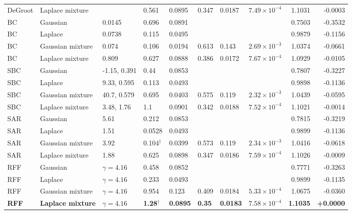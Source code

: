 \begin{longtable}{llllllllrr}
DeGroot & Laplace mixture &  & 0.561 & 0.0895 & 0.347 & 0.0187 & $7.49\times10^{-4}$ & 1.1031 & -0.0003 \\
BC & Gaussian & 0.0145 & 0.696 & 0.0891 &  &  &  & 0.7503 & -0.3532 \\
BC & Laplace & 0.0738 & 0.115 & 0.0495 &  &  &  & 0.9879 & -0.1156 \\
BC & Gaussian mixture & 0.074 & 0.106 & 0.0194 & 0.613 & 0.143 & $2.69\times10^{-3}$ & 1.0374 & -0.0661 \\
BC & Laplace mixture & 0.809 & 0.627 & 0.0888 & 0.386 & 0.0172 & $7.67\times10^{-4}$ & 1.0929 & -0.0105 \\
SBC & Gaussian & -1.15, 0.391 & 0.44 & 0.0853 &  &  &  & 0.7807 & -0.3227 \\
SBC & Laplace & 9.33, 0.595 & 0.113 & 0.0493 &  &  &  & 0.9898 & -0.1136 \\
SBC & Gaussian mixture & 40.7, 0.579 & 0.695 & 0.0403 & 0.575 & 0.119 & $2.32\times10^{-3}$ & 1.0439 & -0.0595 \\
SBC & Laplace mixture & 3.48, 1.76 & 1.1 & 0.0901 & 0.342 & 0.0188 & $7.52\times10^{-4}$ & 1.1021 & -0.0014 \\
SAR & Gaussian & 5.61 & 0.212 & 0.0853 &  &  &  & 0.7815 & -0.3219 \\
SAR & Laplace & 1.51 & 0.0528 & 0.0493 &  &  &  & 0.9899 & -0.1136 \\
SAR & Gaussian mixture & 3.92 & 0.104$^{\dagger}$ & 0.0399 & 0.573 & 0.119 & $2.34\times10^{-3}$ & 1.0416 & -0.0618 \\
SAR & Laplace mixture & 1.88 & 0.625 & 0.0898 & 0.347 & 0.0186 & $7.59\times10^{-4}$ & 1.1026 & -0.0009 \\
RFF & Gaussian & $\gamma=4.16$ & 0.458 & 0.0852 &  &  &  & 0.7771 & -0.3263 \\
RFF & Laplace & $\gamma=4.16$ & 0.233 & 0.0493 &  &  &  & 0.9899 & -0.1135 \\
RFF & Gaussian mixture & $\gamma=4.16$ & 0.954 & 0.123 & 0.409 & 0.0184 & $5.33\times10^{-4}$ & 1.0675 & -0.0360 \\
\textbf{RFF} & \textbf{Laplace mixture} & \textbf{$\gamma=4.16$} & \textbf{1.28$^{\dagger}$} & \textbf{0.0895} & \textbf{0.35} & \textbf{0.0183} & \textbf{$7.58\times10^{-4}$} & \textbf{1.1035} & \textbf{+0.0000} \\
\bottomrule
\end{longtable}
